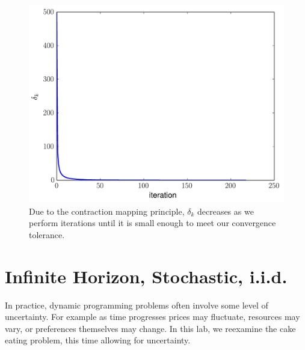 \begin{figure}
\includegraphics[width=\textwidth]{convergence.pdf}
\caption{Due to the contraction mapping principle, $\delta_k$ decreases as we perform iterations
until it is small enough to meet our convergence tolerance.}
\end{figure}

\section*{Infinite Horizon, Stochastic, i.i.d.}\label{SecRecProbInfinHorStochiid}

In practice, dynamic programming problems often involve some level of uncertainty.
For example as time progresses prices may fluctuate, resources may vary, or preferences themselves may change.
 In this lab, we reexamine the cake eating problem, this time allowing for uncertainty.

